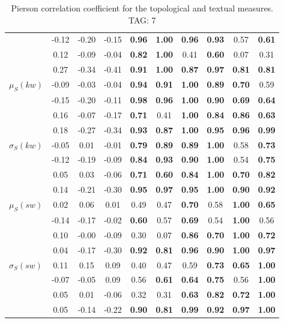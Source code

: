 \begin{table*}[h!]
\begin{center}
\begin{tabular}{| l || c | c | c | c | c | c | c | c | c |}
 & -0.12 & -0.20 & -0.15 & {\bf 0.96} & {\bf 1.00} & {\bf 0.96} & {\bf 0.93} & 0.57 & {\bf 0.61} \\
 & 0.12 & -0.09 & -0.04 & {\bf 0.82} & {\bf 1.00} & 0.41 & {\bf 0.60} & 0.07 & 0.31 \\
 & 0.27 & -0.34 & -0.41 & {\bf 0.91} & {\bf 1.00} & {\bf 0.87} & {\bf 0.97} & {\bf 0.81} & {\bf 0.81} \\\hline
$\mu_S(kw)$ & -0.09 & -0.03 & -0.04 & {\bf 0.94} & {\bf 0.91} & {\bf 1.00} & {\bf 0.89} & {\bf 0.70} & 0.59 \\
 & -0.15 & -0.20 & -0.11 & {\bf 0.98} & {\bf 0.96} & {\bf 1.00} & {\bf 0.90} & {\bf 0.69} & {\bf 0.64} \\
 & 0.16 & -0.07 & -0.17 & {\bf 0.71} & 0.41 & {\bf 1.00} & {\bf 0.84} & {\bf 0.86} & {\bf 0.63} \\
 & 0.18 & -0.27 & -0.34 & {\bf 0.93} & {\bf 0.87} & {\bf 1.00} & {\bf 0.95} & {\bf 0.96} & {\bf 0.99} \\\hline
$\sigma_S(kw)$ & -0.05 & 0.01 & -0.01 & {\bf 0.79} & {\bf 0.89} & {\bf 0.89} & {\bf 1.00} & 0.58 & {\bf 0.73} \\
 & -0.12 & -0.19 & -0.09 & {\bf 0.84} & {\bf 0.93} & {\bf 0.90} & {\bf 1.00} & 0.54 & {\bf 0.75} \\
 & 0.05 & 0.03 & -0.06 & {\bf 0.71} & {\bf 0.60} & {\bf 0.84} & {\bf 1.00} & {\bf 0.70} & {\bf 0.82} \\
 & 0.14 & -0.21 & -0.30 & {\bf 0.95} & {\bf 0.97} & {\bf 0.95} & {\bf 1.00} & {\bf 0.90} & {\bf 0.92} \\\hline
$\mu_S(sw)$ & 0.02 & 0.06 & 0.01 & 0.49 & 0.47 & {\bf 0.70} & 0.58 & {\bf 1.00} & {\bf 0.65} \\
 & -0.14 & -0.17 & -0.02 & {\bf 0.60} & 0.57 & {\bf 0.69} & 0.54 & {\bf 1.00} & 0.56 \\
 & 0.10 & -0.00 & -0.09 & 0.30 & 0.07 & {\bf 0.86} & {\bf 0.70} & {\bf 1.00} & {\bf 0.72} \\
 & 0.04 & -0.17 & -0.30 & {\bf 0.92} & {\bf 0.81} & {\bf 0.96} & {\bf 0.90} & {\bf 1.00} & {\bf 0.97} \\\hline
$\sigma_S(sw)$ & 0.11 & 0.15 & 0.09 & 0.40 & 0.47 & 0.59 & {\bf 0.73} & {\bf 0.65} & {\bf 1.00} \\
 & -0.07 & -0.05 & 0.09 & 0.56 & {\bf 0.61} & {\bf 0.64} & {\bf 0.75} & 0.56 & {\bf 1.00} \\
 & 0.05 & 0.01 & -0.06 & 0.32 & 0.31 & {\bf 0.63} & {\bf 0.82} & {\bf 0.72} & {\bf 1.00} \\
 & 0.05 & -0.14 & -0.22 & {\bf 0.90} & {\bf 0.81} & {\bf 0.99} & {\bf 0.92} & {\bf 0.97} & {\bf 1.00} \\\hline
\end{tabular}
\caption{Pierson correlation coefficient for the topological and textual measures. TAG: 7}
\end{center}
\end{table*}